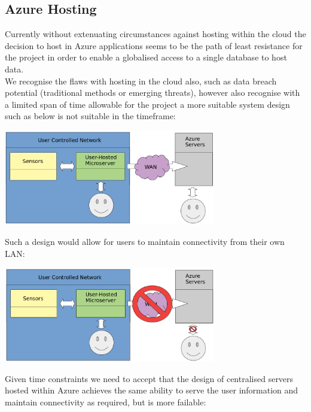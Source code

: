 \documentclass{article}
\begin{document}
        \subsection{Azure Hosting}
            Currently without extenuating circumstances against hosting within the cloud the
            decision to host in Azure applications seems to be the path of least resistance for
            the project in order to enable a globalised access to a single database to host 
            data.
            \\
            We recognise the flaws with hosting in the cloud also, such as data breach potential 
            (traditional methods or emerging threats\cite{SpectreAndMeltdown}), however also
            recognise with a limited span of time allowable for the project a more suitable 
            system design such as below is not suitable in the timeframe:
            \vspace{10mm}
            \begin{center}
                \includegraphics[width=350px]{Images/OptimalSystemDiagram.jpg}
            \end{center}
            Such a design would allow for users to maintain connectivity from their 
            own LAN:
            \begin{center}
                \includegraphics[width=350px]{Images/OptimalSystemDiagramAlternate.jpg}
            \end{center}

            \newpage

            Given time constraints we need to accept that the design of centralised 
            servers hosted within Azure achieves the same ability to serve the user information and maintain connectivity as required, but is more failable:
\end{document}
